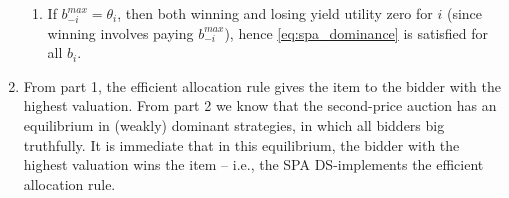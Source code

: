\documentclass[a4paper]{article}
\begin{document}
\begin{enumerate}
\begin{enumerate}
		\item If $b^{max}_{-i} = \theta_i$, then both winning and losing yield utility zero for $i$ (since winning involves paying $b^{max}_{-i}$), hence \eqref{eq:spa_dominance} is satisfied for all $b_i$.
	\end{enumerate}
	
	\item From part 1, the efficient allocation rule gives the item to the bidder with the highest valuation.
	From part 2 we know that the second-price auction has an equilibrium in (weakly) dominant strategies, in which all bidders big truthfully. It is immediate that in this equilibrium, the bidder with the highest valuation wins the item -- i.e., the SPA DS-implements the efficient allocation rule.
\end{enumerate}
\fi 

\end{document}
